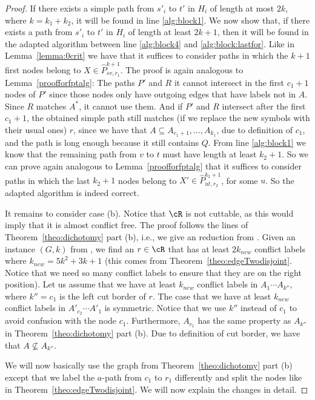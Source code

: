 \documentclass[a4paper,english]{lipics-v2016}
\theoremstyle{plain}
\begin{document}
\begin{proof}
If there exists a simple path from $s'_i$ to $t'$ in $H_i$ of length at most $2k$, where $k= k_1+k_2$, it will be found in line \ref{alg:block1}.
We now show that, if there exists a path from $s'_i$ to $t'$ in $H_i$ of length at least $2k+1$, then it will be found in the adapted algorithm between line \ref{alg:block4} and \ref{alg:block:lastfor}. Like in Lemma~\ref{lemma:0crit} we have that it suffices to consider paths in which the $k+1$ first nodes belong to $X \in \hat{P}^{k+1}_{sv,r_1}$. The proof is again analogous to Lemma~\ref{proofforfptalg}: The paths $P'$ and $R$ it cannot intersect in the first $c_1+1$ nodes of $P'$ since those nodes only have outgoing edges that have labels not in $A$. Since $R$ matches $A^*$, it cannot use them. And if $P'$ and $R$ intersect after the first $c_1+1$, the obtained simple path still matches (if we replace the new symbols with their usual ones) $r$, since we have that $A \subseteq A_{c_1+1}, \ldots, A_{k_1}$, due to definition of $c_1$, and the path is long enough because it still contains $Q$.
From line \ref{alg:block1} we know that the remaining path from $v$ to $t$ must have length at least $k_2+1$.
So we can prove again analogous to Lemma~\ref{proofforfptalg} that it suffices to consider paths in which the last $k_2+1$ nodes belong to $X' \in \hat{P}^{k_2+1}_{ut,r_2}$, for some $u$. So the adapted algorithm is indeed correct. 


It remains to consider case (b). Notice that $\cR$ is not cuttable, as this would imply that it is almost conflict free. The proof follows the lines of Theorem~\ref{theo:dichotomy} part (b), i.e., we give an reduction from \kclique. Given an instance $(G,k)$ from \kclique, we find an $r \in \cR$ that has at least $2k_{new}$ conflict labels where $k_{new} = 5k^2+3k+1$ (this comes from Theorem~\ref{theo:edgeTwodisjoint}. Notice that we need so many conflict labels to ensure that they are on the right position). Let us assume that we have at least $k_{new}$ conflict labels in $A_1 \cdots A_{k''}$, where $k''=c_1$ is the left cut border of $r$. The case that we have at least $k_{new}$ conflict labels in $A'_{c_2} \cdots A'_{1}$ is symmetric.
Notice that we use $k''$ instead of $c_1$ to avoid confusion with the node $c_1$. Furthermore, $A_{c_1}$ has the same property as $A_{k''}$ in Theorem~\ref{theo:dichotomy} part (b).
Due to definition of cut border, we have that $A \not \subseteq A_{k''}$.

We will now basically use the graph from Theorem~\ref{theo:dichotomy} part (b) except that we label the $a$-path from $c_1$ to $r_1$ differently and split the nodes like in Theorem~\ref{theo:edgeTwodisjoint}. 
We will now explain the changes in detail. 


\end{proof}
\end{document}
